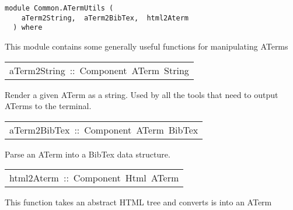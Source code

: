 \label{module:Common.ATermUtils}
\haddockbeginheader
{\haddockverb\begin{verbatim}
module Common.ATermUtils (
    aTerm2String,  aTerm2BibTex,  html2Aterm
  ) where\end{verbatim}}
\haddockendheader

This module contains some generally useful functions for
 manipulating ATerms
\par

\begin{haddockdesc}
\item[\begin{tabular}{@{}l}
aTerm2String\ ::\ Component\ ATerm\ String
\end{tabular}]\haddockbegindoc
Render a given ATerm as a string. Used by all the tools that
 need to output ATerms to the terminal.
\par

\end{haddockdesc}
\begin{haddockdesc}
\item[\begin{tabular}{@{}l}
aTerm2BibTex\ ::\ Component\ ATerm\ BibTex
\end{tabular}]\haddockbegindoc
Parse an ATerm into a BibTex data structure. 
\par

\end{haddockdesc}
\begin{haddockdesc}
\item[\begin{tabular}{@{}l}
html2Aterm\ ::\ Component\ Html\ ATerm
\end{tabular}]\haddockbegindoc
This function takes an abstract HTML tree and converts is into an ATerm
\par

\end{haddockdesc}